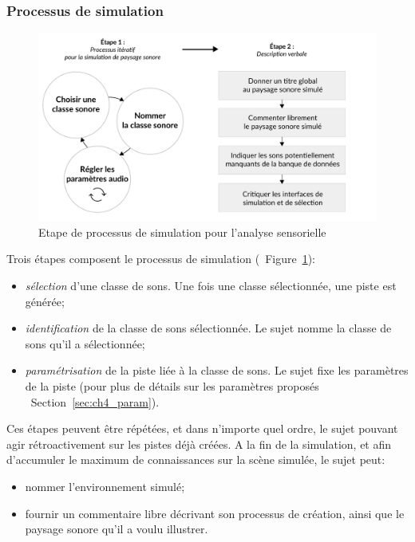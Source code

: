 \subsubsection{Processus de simulation}
\label{sec:ch4_processSimu}

\begin{figure}[t]
        \myfloatalign
        \includegraphics[width=.8\linewidth]{gfx/ch_4/4}
       \caption{Etape de processus de simulation pour l'analyse sensorielle}\label{fig:etapeSimu}
\end{figure}

Trois étapes composent le processus de simulation (\cf~Figure~\ref{fig:etapeSimu}):

\begin{itemize}
\item \emph{sélection} d'une classe de sons. Une fois une classe sélectionnée, une piste est générée; 
\item \emph{identification} de la classe de sons sélectionnée. Le sujet nomme la classe de sons qu'il a sélectionnée;
\item \emph{paramétrisation} de la piste liée à la classe de sons. Le sujet fixe les paramètres de la piste (pour plus de détails sur les paramètres proposés \cf~Section~\ref{sec:ch4_param}).
\end{itemize}

Ces étapes peuvent être répétées, et dans n'importe quel ordre, le sujet pouvant agir rétroactivement sur les pistes déjà créées. A la fin de la simulation, et afin d'accumuler le maximum de connaissances sur la scène simulée, le sujet peut: 

\begin{itemize}
\item nommer l'environnement simulé;
\item fournir un commentaire libre décrivant son processus de création, ainsi que le paysage sonore qu'il a voulu illustrer.
\end{itemize}

